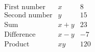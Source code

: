 \[ \begin{array}{lcr}
    \mbox{First number} & x & 8 \\
    \mbox{Second number} & y & 15 \\
    \mbox{Sum} & x + y & 23 \\
    \mbox{Difference} & x - y & -7 \\
    \mbox{Product} & xy & 120
\end{array}\]
